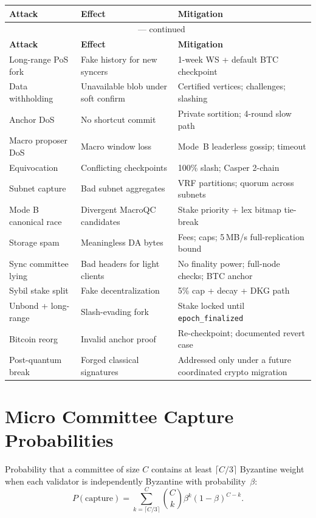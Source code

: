 \documentclass[11pt,a4paper,twoside]{report}
\theoremstyle{definition}
\begin{document}
\begin{longtable}{@{}p{3.6cm} p{4.6cm} p{6.0cm}@{}}
  \toprule
  \textbf{Attack} & \textbf{Effect} & \textbf{Mitigation} \\
  \midrule
  \endfirsthead
  \multicolumn{3}{c}{{\tablename\ \thetable{} --- continued}} \\
  \toprule
  \textbf{Attack} & \textbf{Effect} & \textbf{Mitigation} \\
  \midrule
  \endhead
  Long-range PoS fork & Fake history for new syncers & 1-week WS + default BTC checkpoint \\
  Data withholding & Unavailable blob under soft confirm & Certified vertices; challenges; slashing \\
  Anchor DoS & No shortcut commit & Private sortition; 4-round slow path \\
  Macro proposer DoS & Macro window loss & Mode~B leaderless gossip; timeout \\
  Equivocation & Conflicting checkpoints & 100\% slash; Casper 2-chain \\
  Subnet capture & Bad subnet aggregates & VRF partitions; quorum across subnets \\
  Mode B canonical race & Divergent MacroQC candidates & Stake priority + lex bitmap tie-break \\
  Storage spam & Meaningless DA bytes & Fees; caps; 5\,MB/s full-replication bound \\
  Sync committee lying & Bad headers for light clients & No finality power; full-node checks; BTC anchor \\
  Sybil stake split & Fake decentralization & 5\% cap + decay + DKG path \\
  Unbond + long-range & Slash-evading fork & Stake locked until \texttt{epoch\_finalized} \\
  Bitcoin reorg & Invalid anchor proof & Re-checkpoint; documented revert case \\
  Post-quantum break & Forged classical signatures & Addressed only under a future coordinated crypto migration \\
  \bottomrule
\end{longtable}

\chapter{Micro Committee Capture Probabilities}
\label{app:capture}

Probability that a committee of size $C$ contains at least $\lceil C/3 \rceil$ Byzantine weight when each validator is independently Byzantine with probability~$\beta$:
\[
  P(\text{capture}) = \sum_{k=\lceil C/3 \rceil}^{C} \binom{C}{k} \beta^k (1-\beta)^{C-k}.
\]
\end{document}
